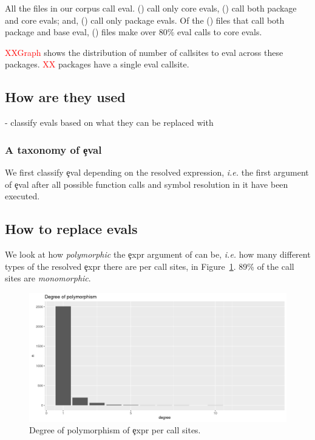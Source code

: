 \documentclass[conference]{IEEEtran}
\newcommand{\missingNumber}{\textcolor{red}{XX}\xspace}
\newcommand{\missingGraph}{\textcolor{red}{XXGraph}\xspace}
\begin{document}
All the \TotalFileCount files in our corpus call eval. \CoreEvalFileCount
(\CoreEvalFilePerc) call only core evals, \AllEvalFileCount (\AllEvalFilePerc)
call both package and core evals; and, \PackageEvalFileCount
(\PackageEvalFilePerc) call only package evals. Of the \AllEvalFileCount
(\AllEvalFilePerc) files that call both package and base eval,
\EightyCoreEvalFilePerc (\EightyCoreEvalFileCount) files make over 80\% eval
calls to core evals.



\missingGraph shows the distribution of number of callsites to eval across these
packages. \missingNumber packages have a single eval callsite.


\subsection{How are they used}

- classify evals based on what they can be replaced with

\subsubsection{A taxonomy of \c{eval}}

We first classify \c{eval} depending on the resolved expression, \emph{i.e.}
the first argument of \c{eval} after all possible function calls and symbol
resolution in it have been executed.




\subsection{How to replace evals}

We look at how \emph{polymorphic} the \c{expr} argument of \eval can be, \emph{i.e.} how many different types of the resolved \c{expr} there are per call sites, in Figure~\ref{fig:polymorphism}. 89\% of the call sites are \emph{monomorphic}.

\begin{figure}
    \includegraphics[width=\columnwidth]{polymorphism-1}
    \caption{Degree of polymorphism of \c{expr} per call sites.} \label{fig:polymorphism}
\end{figure}
\end{document}
